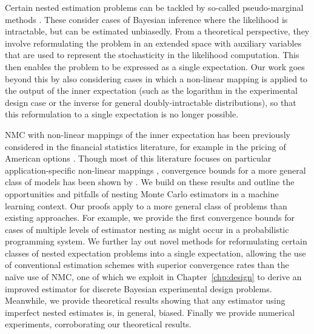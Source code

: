 Certain nested estimation problems can be tackled by so-called pseudo-marginal methods
\citep{beaumont2003estimation,andrieu2009pseudo,andrieu2010particle,
	andrieu2015convergence,naessethLS2015nested}.
These consider cases of Bayesian inference where the likelihood is intractable, 
but can be estimated unbiasedly.
From a theoretical perspective, they involve reformulating the problem in an extended space with auxiliary variables that
are used to represent the stochasticity in the likelihood computation. This then enables the
problem to be expressed as a single expectation.
Our work goes beyond this by also considering cases in which a non-linear mapping is
applied to the output of the inner expectation (such as the logarithm in the 
experimental design case or the inverse for general doubly-intractable distributions), so that 
this reformulation to a single expectation is no longer possible.

NMC with non-linear mappings of the inner expectation has been previously considered in
the financial statistics literature, for example in the pricing of American
options \citep{longstaff2001valuing}. Though most of this literature focuses on
particular application-specific non-linear mappings \citep{broadie2011efficient,gordy2010nested},
convergence bounds for a more general class of models
has been shown by \citet{hong2009estimating}.
We build on these results and outline the opportunities and pitfalls of nesting Monte Carlo
estimators in a machine learning context.
Our proofs apply to a more general class of problems than existing approaches.
For example, we provide the first convergence bounds for cases of multiple levels of estimator nesting
as might occur in a probabilistic programming system.
We further lay out novel methods for reformulating certain classes of nested expectation problems
into a single expectation, allowing the use of conventional \mc estimation 
schemes with superior convergence rates than the na\"{i}ve use of NMC, one of which we
exploit in Chapter~\ref{chp:design} to derive an improved estimator for discrete
Bayesian experimental design problems.
Meanwhile, we provide theoretical results showing that any \mc
estimator using imperfect nested estimates is, in general, biased.  Finally we provide numerical
experiments, corroborating our theoretical results.



